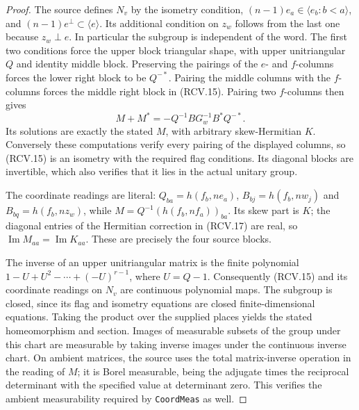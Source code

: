 \begin{proof}
The source defines \(N_v\) by the isometry condition,
\((n-1)e_a\in\langle e_b:b<a\rangle\), and
\((n-1)e^\perp\subset\langle e\rangle\).  Its additional
condition on \(z_w\) follows from the last one because
\(z_w\perp e\).  In particular the subgroup is independent of
the word.  The first two conditions force the upper block triangular
shape, with upper unitriangular \(Q\) and identity middle block.
Preserving the pairings of the \(e\)- and \(f\)-columns forces
the lower right block to be \(Q^{-*}\).  Pairing the middle
columns with the \(f\)-columns forces the middle right block in
(RCV.15).  Pairing two \(f\)-columns then gives
\[
 M+M^*=-Q^{-1}BG_w^{-1}B^*Q^{-*}.
\tag{RCV.17}
\]
Its solutions are exactly the stated \(M\), with arbitrary
skew-Hermitian \(K\).  Conversely these computations verify every
pairing of the displayed columns, so (RCV.15) is an isometry with
the required flag conditions.  Its diagonal blocks are invertible,
which also verifies that it lies in the actual unitary group.

The coordinate readings are literal: \(Q_{ba}=h(f_b,ne_a)\),
\(B_{bj}=h(f_b,nw_j)\) and \(B_{bq}=h(f_b,nz_w)\), while
\(M=Q^{-1}(h(f_b,nf_a))_{ba}\).  Its skew part is \(K\);
the diagonal entries of the Hermitian correction in (RCV.17)
are real, so \(\operatorname{Im}M_{aa}=\operatorname{Im}K_{aa}\).
These are precisely the four source blocks.

The inverse of an upper unitriangular matrix is the finite polynomial
\(1-U+U^2-\cdots+(-U)^{r-1}\), where \(U=Q-1\).
Consequently (RCV.15) and its coordinate readings on \(N_v\)
are continuous polynomial maps.  The subgroup is closed, since its
flag and isometry equations are closed finite-dimensional equations.
Taking the product over the supplied places yields the stated
homeomorphism and section.  Images of measurable subsets of the
group under this chart are measurable by taking inverse images under
the continuous inverse chart.  On ambient matrices, the source uses
the total matrix-inverse operation in the reading of \(M\); it is
Borel measurable, being the adjugate times the reciprocal determinant
with the specified value at determinant zero.  This verifies the
ambient measurability required by \texttt{CoordMeas} as well.
\end{proof}

